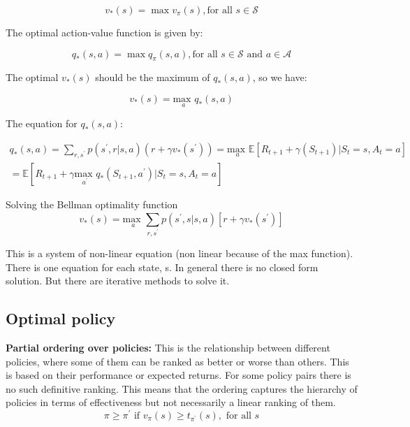 	\begin{equation}
		v_*(s) = \max v_\pi(s), \text{for all } s \in \mathcal{S}
	\end{equation}

The optimal action-value function is given by:

	\begin{equation}
		q_*(s,a) = \max q_\pi(s,a), \text{for all } s \in \mathcal{S} \text{ and } a \in \mathcal{A}
	\end{equation}

The optimal $v_*(s)$ should be the maximum of $q_*(s,a)$, so we have:

	\begin{equation}
		v_*(s) = \underset{a}{\text{max }} q_*(s,a)
	\end{equation}

The equation for $q_*(s,a)$:


	\begin{equation}
	\begin{aligned}
		q_*(s,a) = \sum_{r, s^{\prime}}^{} p(s^{\prime},r |s,a)(r + \gamma v_*(s^{\prime})) = \underset{a}{\text{max }} \mathbb{E}[R_{t+1} + \gamma(S_{t+1}) | S_t = s, A_t = a] \\
		 = \mathbb{E}[R_{t+1} + \gamma \underset{a^{\prime}}{\text{max }} q_* (S_{t+1}, a^{\prime}) |S_t =s, A_t = a]
	\end{aligned}
	\end{equation}


\begin{wbox}{Solving the Bellman optimality function}
	\begin{equation}
		v_*(s) = \underset{a}{\text{max }} \sum_{r,s^{\prime}}^{} p(s^{\prime},s |s,a)[r+\gamma v_*(s^{\prime})]
	\end{equation}
\end{wbox}

This is a system of non-linear equation (non linear because of the max function). There is one equation for each state, s. In general there is no closed form solution. But there are iterative methods to solve it. 

\subsection{Optimal policy}
\textbf{Partial ordering over policies: } This is the relationship between different policies, where some of them can be ranked as better or worse than others. This is based on their performance or expected returns. For some policy pairs there is no such definitive ranking. This means that the ordering captures the hierarchy of policies in terms of effectiveness  but not necessarily a linear ranking of them. 
	\begin{equation}
		\pi \ge \pi^{\prime} \text{ if } v_\pi(s) \ge t_{\pi^{\prime}}(s), \text{ for all }s
	\end{equation}

